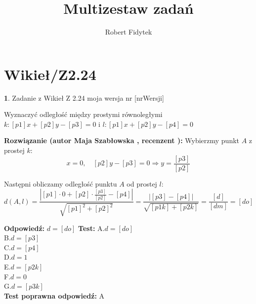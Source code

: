 \documentclass[12pt, a4paper]{article}
\title{Multizestaw zadań}
\author{Robert Fidytek}
\date{}
\theoremstyle{definition} %
\newtheorem{zad}{}
\newcommand{\kategoria}[1]{\section{#1}} %
\newcommand{\zadStart}[1]{\begin{zad}#1\newline} %
\newcommand{\zadStop}{\end{zad}}   %
\newcommand{\rozwStart}[2]{\noindent \textbf{Rozwiązanie (autor #1 , recenzent #2): }\newline} %
\newcommand{\rozwStop}{\newline}                                            %
\newcommand{\odpStart}{\noindent \textbf{Odpowiedź:}\newline}    %
\newcommand{\odpStop}{\newline}                                             %
\newcommand{\testStart}{\noindent \textbf{Test:}\newline} %
\newcommand{\testStop}{\newline} %
\newcommand{\kluczStart}{\noindent \textbf{Test poprawna odpowiedź:}\newline} %
\newcommand{\kluczStop}{\newline} %
\begin{document}
\maketitle


\kategoria{Wikieł/Z2.24}
\zadStart{Zadanie z Wikieł Z 2.24  moja wersja nr [nrWersji]}


Wyznaczyć odległość między prostymi równoległymi $k:[p1]x+[p2]y-[p3]=0$ i $l:[p1]x+[p2]y-[p4]=0$
\zadStop

\rozwStart{Maja Szabłowska}{}
Wybierzmy punkt $A$ z prostej $k$:
$$x=0, \quad [p2]y-[p3]=0 \Rightarrow y=\frac{[p3]}{[p2]}$$

Następni obliczamy odległość punktu $A$ od prostej $l$:
$$d(A,l)=\frac{|[p1]\cdot0+[p2]\cdot\frac{[p3]}{[p2]}-[p4]|}{\sqrt{[p1]^{2}+[p2]^{2}}}=\frac{|[p3]-[p4]|}{\sqrt{[p1k]+[p2k]}}=\frac{[d]}{[dm]}=[do]$$
\rozwStop


\odpStart
$d=[do]$
\odpStop
\testStart
A.$d=[do]$\\
B.$d=[p3]$\\
C.$d=[p4]$\\
D.$d=1$\\
E.$d=[p2k]$\\
F.$d=0$\\
G.$d=[p3k]$\\
\testStop
\kluczStart
A
\kluczStop
\end{document}
